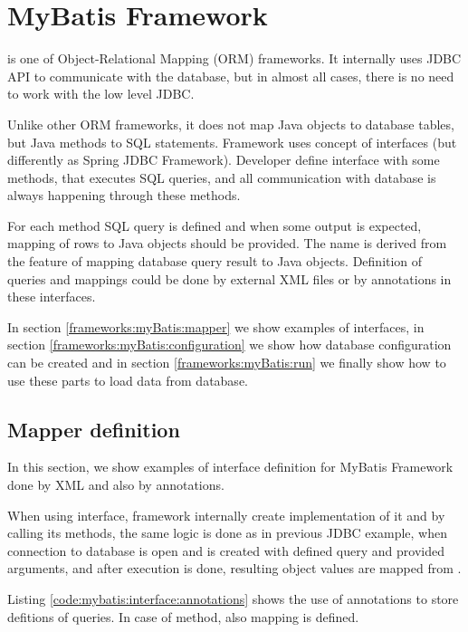 \section{MyBatis Framework \label{frameworks:myBatis}}

\citet{MyBatis} is one of Object-Relational Mapping (ORM) frameworks.
It internally uses JDBC API to communicate with the database, but in almost all cases,
there is no need to work with the low level JDBC.

Unlike other ORM frameworks, it does not map Java objects to database tables, but Java methods
to SQL statements. Framework uses concept of  interfaces (but differently as Spring JDBC Framework).
Developer define  interface with some methods, that executes SQL queries,
and all communication with database is always happening through these methods.

For each method SQL query is defined and when some output is expected,
mapping of rows to Java objects should be provided.
The name  is derived from the feature of mapping database query result
to Java objects.
Definition of queries and mappings could be done by external XML files or by annotations in these interfaces.

In section \ref{frameworks:myBatis:mapper} we show examples of  interfaces,
in section \ref{frameworks:myBatis:configuration} we show how database configuration
can be created and in section \ref{frameworks:myBatis:run} we finally show how to
use these parts to load data from database.




\subsection{Mapper definition \label{frameworks:myBatis:mapper}}

In this section, we show examples of  interface definition
for MyBatis Framework done by XML and also by annotations.

When using  interface, framework internally create implementation
of it and by calling its methods, the same logic is done as
in previous JDBC example, when connection to database is open
and  is created with defined query and provided arguments,
and after execution is done, resulting object values are mapped from .

Listing \ref{code:mybatis:interface:annotations} shows the use of annotations
to store defitions of queries. In case of  method, also mapping is defined.

